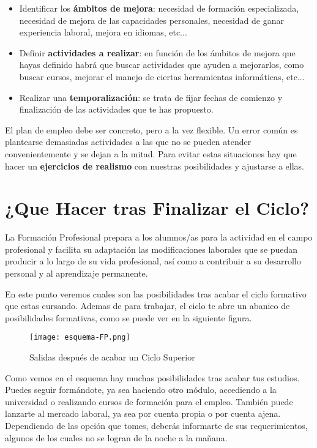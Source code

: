 \begin{itemize}
    \item Identificar los \textbf{ámbitos de mejora}: necesidad de formación especializada, necesidad de mejora de las capacidades personales, necesidad de ganar experiencia laboral, mejora en idiomas, etc...
    \item Definir \textbf{actividades a realizar}: en función de los ámbitos de mejora que hayas definido habrá que buscar actividades que ayuden a mejorarlos, como buscar cursos, mejorar el manejo de ciertas herramientas informáticas, etc...
    \item Realizar una \textbf{temporalización}: se trata de fijar fechas de comienzo y finalización de las actividades que te has propuesto.
\end{itemize}

El plan de empleo debe ser concreto, pero a la vez flexible. Un error común es plantearse demasiadas actividades a las que no se pueden atender convenientemente y se dejan a la mitad. Para evitar estas situaciones hay que hacer un \textbf{ejercicios de realismo} con nuestras posibilidades y ajustarse a ellas.

\section{¿Que Hacer tras Finalizar el Ciclo?}
La Formación Profesional prepara a los alumnos/as para la actividad en el campo profesional y facilita su adaptación  las modificaciones laborales que se puedan producir a lo largo de su vida profesional, así como a contribuir a su desarrollo personal y al aprendizaje permanente.

En este punto veremos cuales son las posibilidades tras acabar el ciclo formativo que estas cursando. Ademas de para trabajar, el ciclo te abre un abanico de posibilidades formativas, como se puede ver en la siguiente figura.

\begin{figure}[ht]
    \centering
    \texttt{[image: esquema-FP.png]}
    \caption{Salidas después de acabar un Ciclo Superior}
\end{figure}

Como vemos en el esquema hay muchas posibilidades tras acabar tus estudios. Puedes seguir formándote, ya sea haciendo otro módulo, accediendo a la universidad o realizando cursos de formación para el empleo. También puede lanzarte al mercado laboral, ya sea por cuenta propia o por cuenta ajena. Dependiendo de las opción que tomes, deberás informarte de sus requerimientos, algunos de los cuales no se logran de la noche a la mañana.

